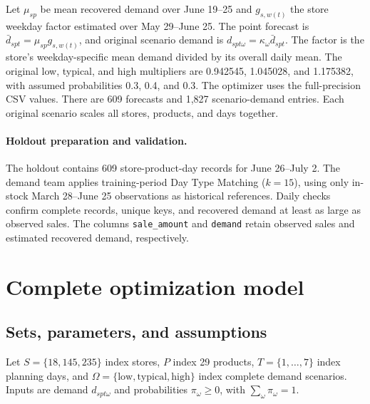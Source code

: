 \documentclass[11pt,letterpaper]{article}
\begin{document}
Let $\mu_{sp}$ be mean recovered demand over June 19--25 and
$g_{s,w(t)}$ the store weekday factor estimated over May 29--June 25.
The point forecast is $\bar d_{spt}=\mu_{sp}g_{s,w(t)}$, and original
scenario demand is $d_{spt\omega}=\kappa_\omega\bar d_{spt}$.
The factor is the store's weekday-specific mean demand divided by its
overall daily mean. The original low, typical, and high multipliers are
0.942545, 1.045028, and 1.175382, with assumed probabilities 0.3, 0.4, and 0.3.
The optimizer uses the full-precision CSV values. There are 609 forecasts
and 1,827 scenario-demand entries. Each original scenario scales all
stores, products, and days together.



\paragraph{Holdout preparation and validation.}
The holdout contains 609 store-product-day records for June 26--July 2.
The demand team applies training-period Day Type Matching ($k=15$), using only
in-stock March 28--June 25 observations as historical references. Daily checks
confirm complete records, unique keys, and recovered demand at least as large
as observed sales. The columns \texttt{sale\_amount} and \texttt{demand} retain
observed sales and estimated recovered demand, respectively.

\clearpage
\section{Complete optimization model}
\subsection{Sets, parameters, and assumptions}
Let $S=\{18,145,235\}$ index stores, $P$ index 29 products,
$T=\{1,\ldots,7\}$ index planning days, and
$\Omega=\{\mathrm{low},\mathrm{typical},\mathrm{high}\}$ index complete
demand scenarios. Inputs are demand $d_{spt\omega}$ and probabilities
$\pi_\omega\geq0$, with $\sum_\omega\pi_\omega=1$.
\end{document}
